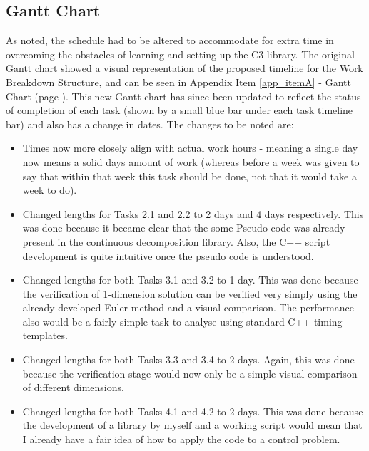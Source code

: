 \documentclass[11pt,draftd]{article}
\begin{document}
\subsection{Gantt Chart}
As noted, the schedule had to be altered to accommodate for extra time in overcoming the obstacles of learning and setting up the C3 library. The original Gantt chart showed a visual representation of the proposed timeline for the Work Breakdown Structure, and can be seen in Appendix Item \ref{app_itemA} - Gantt Chart (page \pageref{app_itemA}). This new Gantt chart has since been updated to reflect the status of completion of each task (shown by a small blue bar under each task timeline bar) and also has a change in dates. The changes to be noted are: \\
\begin{itemize}
	\item Times now more closely align with actual work hours - meaning a single day now means a solid days amount of work (whereas before a week was given to say that within that week this task should be done, not that it would take a week to do).
	\item Changed lengths for Tasks 2.1 and 2.2 to 2 days and 4 days respectively. This was done because it became clear that the some Pseudo code was already present in the continuous decomposition library. Also, the C++ script development is quite intuitive once the pseudo code is understood.
	\item Changed lengths for both Tasks 3.1 and 3.2 to 1 day. This was done because the verification of 1-dimension solution can be verified very simply using the already developed Euler method and a visual comparison. The performance also would be a fairly simple task to analyse using standard C++ timing templates.
	\item Changed lengths for both Tasks 3.3 and 3.4 to 2 days. Again, this was done because the verification stage would now only be a simple visual comparison of different dimensions.
	\item Changed lengths for both Tasks 4.1 and 4.2 to 2 days. This was done because the development of a library by myself and a working script would mean that I already have a fair idea of how to apply the code to a control problem. \\
\end{itemize}
\end{document}
